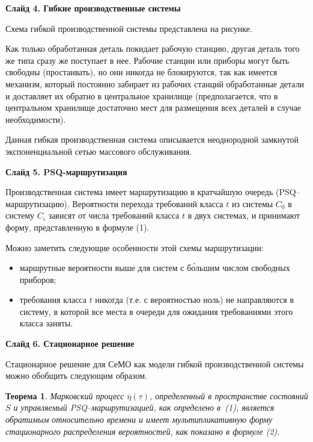 \documentclass[a4paper,14pt]{extarticle}
\theoremstyle{note}
\newtheorem{theorem}{Теорема}
\begin{document}

\textbf{Слайд 4. Гибкие производственные системы}

Схема гибкой производственной системы представлена на рисунке.

Как только обработанная деталь покидает рабочую станцию, другая деталь того же типа сразу же поступает в нее. Рабочие станции или приборы могут быть свободны (простаивать), но они никогда не блокируются, так как имеется механизм, который постоянно забирает из рабочих станций обработанные детали и доставляет их обратно в центральное хранилище (предполагается, что в центральном хранилище достаточно мест для размещения всех деталей в случае необходимости).

Данная гибкая производственная система описывается неоднородной замкнутой экспоненциальной сетью массового обслуживания.


\textbf{Слайд 5. PSQ-маршрутизация}

Производственная система имеет маршрутизацию в кратчайшую очередь (PSQ--маршрутизацию). Вероятности перехода требований класса $t$ из системы $C_0$ в систему $C_i$ зависят от числа требований класса $t$ в двух системах, и принимают форму, представленную в формуле (1).

Можно заметить следующие особенности этой схемы маршрутизации:
\begin{itemize}
\item маршрутные вероятности выше для систем с б\'{о}льшим числом свободных приборов;
\item требования класса $t$ никогда (т.е. с вероятностью ноль) не направляются в систему, в которой все места в очереди для ожидания требованиями этого класса заняты.
\end{itemize}


\textbf{Слайд 6. Стационарное решение}

Стационарное решение для СеМО как модели гибкой производственной системы можно обобщить следующим образом.

\begin{theorem}
Марковский процесс $\overline{\eta}(\tau)$, определенный в пространстве состояний $S$ и управляемый PSQ--маршрутизацией, как определено в~(1), является обратимым относительно времени и имеет мультипликативную форму стационарного распределения вероятностей, как показано в формуле (2).
\end{theorem}
\end{document}
